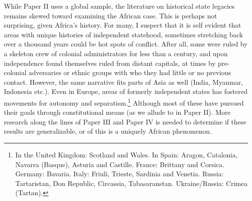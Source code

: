 While Paper II uses a global sample, the literature on historical state legacies
remains skewed toward examining the African case. This is perhaps not
surprising, given Africa's history. For many, I suspect that it is self evident
that areas with unique histories of independent statehood, sometimes stretching
back over a thousand years could be hot spots of conflict. After all, some were
ruled by a skeleton crew of colonial administrators \citep{englebert2013inside}
for less than a century, and upon independence found themselves ruled from
distant capitals, at times by pre-colonial adversaries or ethnic groups with who
they had little or no previous contact. However, the same narrative fits parts
of Asia as well (India, Myanmar, Indonesia etc.). Even in Europe, areas of
formerly independent states has fostered movements for autonomy and
separatism.\footnote{In the United Kingdom: Scotland and Wales. In Spain:
	Aragon, Catalonia, Navarra (Basque), Asturia and Castille. France:
Brittany and Corsica. Germany: Bavaria. Italy: Friuli, Trieste, Sardinia and
Venetia. Russia: Tartaristan, Don Republic, Circassia, Tabasaranstan.
Ukraine/Russia: Crimea (Tartan).} Although most of these have pursued their
goals through constitutional means (as we allude to in Paper II). More research
along the lines of Paper III and Paper IV is needed to determine if these
results are generalizable, or of this is a uniquely African phenomenon.





